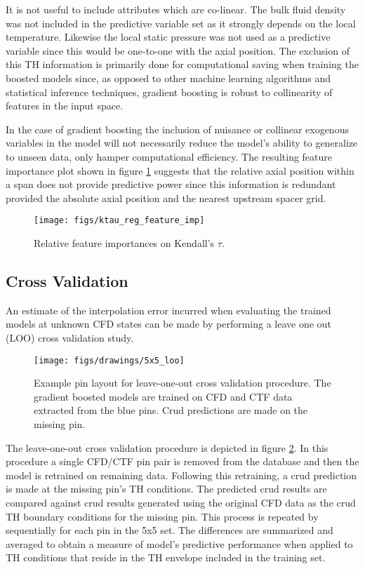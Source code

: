 It is not useful to include attributes which are co-linear. The bulk fluid density was not included in the predictive variable set as it strongly depends on the local temperature. Likewise the local static pressure was not used as a predictive variable since this would be one-to-one with the axial position.  The exclusion of this TH information is primarily done for computational saving when training the boosted models since, as opposed to other machine learning algorithms and statistical inference techniques, gradient boosting is robust to collinearity of features in the input space.

In the case of gradient boosting the inclusion of nuisance or collinear exogenous variables in the model will not necessarily reduce the model's ability to generalize to unseen data, only hamper computational efficiency.  The resulting feature importance plot shown in figure \ref{fig:ktauregfeatureimp} suggests that the relative axial position within a span does not provide predictive power since this information is redundant provided the absolute axial position and the nearest upstream spacer grid.

\begin{figure}[H]
    \centering
    \texttt{[image: figs/ktau\_reg\_feature\_imp]}
    \caption[Relative feature importance.]{Relative feature importances on Kendall's $\tau$.}
    \label{fig:ktauregfeatureimp}
\end{figure}


\subsection{Cross Validation}

An estimate of the interpolation error incurred when evaluating the trained models at unknown CFD states can be made by performing a leave one out (LOO) cross validation study.

\begin{figure}[h]
    \centering
    \texttt{[image: figs/drawings/5x5\_loo]}
    \caption[Example pin layout for leave-one-out cross validation procedure.]{Example pin layout for leave-one-out cross validation procedure.  The gradient boosted models are trained on CFD and CTF data extracted from the blue pins.  Crud predictions are made on the missing pin.}
    \label{fig:5x5loo}
\end{figure}

The leave-one-out cross validation procedure is depicted in figure \ref{fig:5x5loo}.  In this procedure a single CFD/CTF pin pair is removed from the database and then the model is retrained on remaining data.  Following this retraining, a crud prediction is made
at the missing pin's TH conditions.  The predicted crud results are compared against crud results generated using the original CFD data as the crud TH boundary conditions for the missing pin.  This process is repeated by sequentially for each pin in the 5x5 set.  The differences are summarized and averaged to obtain a measure of model's predictive performance when applied to TH conditions that reside in the TH envelope included in the training set.

